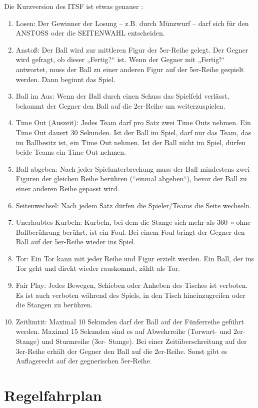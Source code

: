 Die Kurzversion des ITSF ist etwas genauer \cite{itsf_basic_rules}:
\begin{enumerate}
\item Losen:
Der Gewinner der Losung – z.B. durch 
Münzwurf – darf sich für den 
ANSTOSS oder die SEITENWAHL 
entscheiden.
\item Anstoß:
Der Ball wird zur mittleren Figur der 
5er-Reihe gelegt. Der Gegner wird 
gefragt, ob dieser „Fertig?“ ist. Wenn 
der Gegner mit „Fertig!“ antwortet, 
muss der Ball zu einer anderen Figur 
auf der 5er-Reihe gespielt werden. 
Dann beginnt das Spiel.
\item Ball im Aus:
Wenn der Ball durch einen Schuss 
das Spielfeld verlässt, bekommt der 
Gegner den Ball auf die 2er-Reihe um 
weiterzuspielen.
\item Time Out (Auszeit):
Jedes Team darf pro Satz zwei Time 
Outs nehmen. Ein Time Out dauert 30 
Sekunden. Ist der Ball im Spiel, darf 
nur das Team, das im Ballbesitz ist, 
ein Time Out nehmen. Ist der Ball 
nicht im Spiel, dürfen beide Teams 
ein Time Out nehmen.
\item Ball abgeben:
Nach jeder Spielunterbrechung muss 
der Ball mindestens zwei Figuren der 
gleichen Reihe berühren (“einmal 
abgeben“), bevor der Ball zu einer 
anderen Reihe gepasst wird.
\item Seitenwechsel:
Nach jedem Satz dürfen die 
Spieler/Teams die Seite wechseln.
\item Unerlaubtes Kurbeln:
Kurbeln, bei dem die Stange sich 
mehr als 360~$\circ$ ohne Ballberührung 
berührt, ist ein Foul. Bei einem Foul 
bringt der Gegner den Ball auf der 
5er-Reihe wieder ins Spiel.
\item Tor:
Ein Tor kann mit jeder Reihe und 
Figur erzielt werden. Ein Ball, der ins 
Tor geht und direkt wieder 
rauskommt, zählt als Tor.
\item Fair Play:
Jedes Bewegen, Schieben oder 
Anheben des Tisches ist verboten. Es 
ist auch verboten während des 
Spiels, in den Tisch hineinzugreifen 
oder die Stangen zu berühren.
\item Zeitlimtit:
Maximal 10 Sekunden darf der Ball 
auf der Fünferreihe geführt werden. 
Maximal 15 Sekunden sind es auf 
Abwehrreihe (Torwart- und 2er-
Stange) und Sturmreihe (3er-
Stange). Bei einer Zeitüberschreitung 
auf der 3er-Reihe erhält der Gegner 
den Ball auf die 2er-Reihe. Sonst gibt 
es Auflagerecht auf der gegnerischen 
5er-Reihe.
\end{enumerate}


\section{Regelfahrplan}
\label{regeln:regelfahrplan}

